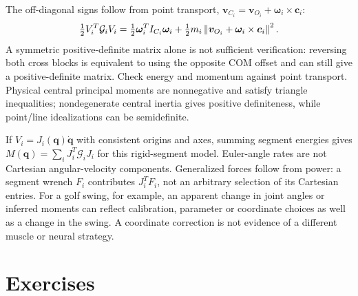 The off-diagonal signs follow from point transport,
$\bm{v}_{C_i}=\bm{v}_{O_i}+\bm{\omega}_i\times\bm{c}_i$:
\begin{equation}
 \tfrac12 V_i^T\mathcal{G}_i V_i
 =\tfrac12\bm{\omega}_i^T I_{C_i}\bm{\omega}_i
  +\tfrac12m_i\left\lVert \bm{v}_{O_i}+\bm{\omega}_i\times\bm{c}_i \right\rVert^2.
 \label{eq:ch2:energy}
\end{equation}
A symmetric positive-definite matrix alone is not sufficient verification:
reversing both cross blocks is equivalent to using the opposite COM offset
and can still give a positive-definite matrix. Check energy and momentum
against point transport. Physical central principal moments are nonnegative
and satisfy triangle inequalities; nondegenerate central inertia gives positive
definiteness, while point/line idealizations can be semidefinite.

If $V_i=J_i(\bm{q})\dot{\bm{q}}$ with consistent origins and axes, summing
segment energies gives $M(\bm{q})=\sum_i J_i^T\mathcal{G}_iJ_i$ for this
rigid-segment model. Euler-angle rates are not Cartesian angular-velocity
components. Generalized forces follow from power: a segment wrench $F_i$
contributes $J_i^TF_i$, not an arbitrary selection of its Cartesian entries.
For a golf swing, for example, an apparent change in joint angles or inferred moments can
reflect calibration, parameter or coordinate choices as well as a change in
the swing. A coordinate correction is not evidence of a different muscle or
neural strategy.

\section*{Exercises}

